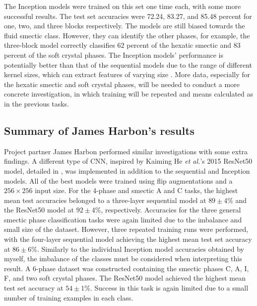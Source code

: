 \documentclass[12pt]{article}
\begin{document}
The Inception models were trained on this set one time each, with some more successful results. The test set accuracies were 72.24, 83.27, and 85.48 percent for one, two, and three blocks respectively. The models are still biased towards the fluid smectic class. However, they can identify the other phases, for example, the three-block model correctly classifies 62 percent of the hexatic smectic and 83 percent of the soft crystal phases. The Inception models' performance is potentially better than that of the sequential models due to the range of different kernel sizes, which can extract features of varying size \cite{Aghdam17}. More data, especially for the hexatic smectic and soft crystal phases, will be needed to conduct a more concrete investigation, in which training will be repeated and means calculated as in the previous tasks.
\subsection{Summary of James Harbon's results}
Project partner James Harbon performed similar investigations with some extra findings. A different type of CNN, inspired by Kaiming He \textit{et al.}'s 2015 ResNet50 model, detailed in \cite{He16}, was implemented in addition to the sequential and Inception models. All of the best models were trained using flip augmentations and a $256 \times 256$ input size. For the 4-phase and smectic A and C tasks, the highest mean test accuracies belonged to a three-layer sequential model at $89\pm4$\% and the ResNet50 model at $92\pm4$\%, respectively. Accuracies for the three general smectic phase classification tasks were again limited due to the imbalance and small size of the dataset. However, three repeated training runs were performed, with the four-layer sequential model achieving the highest mean test set accuracy at $86\pm6$\%. Similarly to the individual Inception model accuracies obtained by myself, the imbalance of the classes must be considered when interpreting this result. A 6-phase dataset was constructed containing the smectic phases C, A, I, F, and two soft crystal phases. The ResNet50 model achieved the highest mean test set accuracy at $54\pm1$\%. Success in this task is again limited due to a small number of training examples in each class.  
\end{document}
